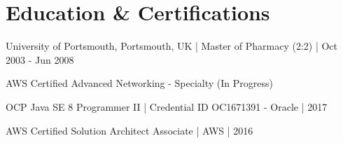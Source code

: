 \documentclass[letterpaper,11pt]{article}
\newcommand{\resumeSubItem}[1]{\item\small{#1}\vspace{-1pt}}
\begin{document}
\section{Education \& Certifications}
        \resumeSubItem{University of Portsmouth, Portsmouth, UK | Master of Pharmacy (2:2) | Oct 2003 - Jun 2008}
        \resumeSubItem{AWS Certified Advanced Networking - Specialty (In Progress)}
        \resumeSubItem{OCP Java SE 8 Programmer II | \small Credential ID OC1671391 - Oracle | 2017}
        \resumeSubItem{AWS Certified Solution Architect Associate | \small AWS | 2016}
\end{document}
